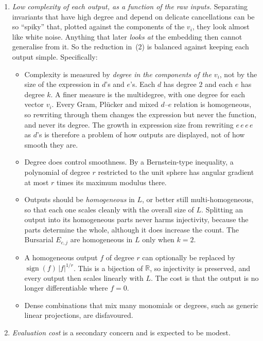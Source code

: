 \documentclass[11pt]{article}
\theoremstyle{definition}
\theoremstyle{remark}
\begin{document}
\begin{enumerate}
  \item \emph{Low complexity of each output, as a function of the raw inputs.}
    Separating invariants that have high degree and depend on delicate
    cancellations can be so ``spiky'' that, plotted against the components of
    the $v_i$, they look almost like white noise. Anything that later
    \emph{looks at} the embedding then cannot generalise from it. So the
    reduction in~(2) is balanced against keeping each output simple. Specifically:
    \begin{itemize}
      \item Complexity is measured by \emph{degree in the components of the
        $v_i$}, not by the size of the expression in $d$'s and $e$'s. Each $d$
        has degree $2$ and each $e$ has degree $k$. A finer measure is the
        multidegree, with one degree for each vector $v_i$. Every Gram,
        Plücker and mixed $d$--$e$ relation is homogeneous, so rewriting
        through them changes the expression but never the function, and never
        its degree. The growth in expression size from rewriting $e\,e\,e\,e$
        as $d$'s is therefore a problem of how outputs are displayed, not of
        how smooth they are.
      \item Degree does control smoothness. By a Bernstein-type inequality, a
        polynomial of degree $r$ restricted to the unit sphere has angular
        gradient at most $r$ times its maximum modulus there.
      \item Outputs should be \emph{homogeneous} in $L$, or better still
        multi-homogeneous, so that each one scales cleanly with the overall
        size of $L$. Splitting an output into its homogeneous parts never
        harms injectivity, because the parts determine the whole, although it
        does increase the count. The Bursarial $E_{c,j}$ are homogeneous in
        $L$ only when $k = 2$.
      \item A homogeneous output $f$ of degree $r$ can optionally be replaced by
        $\operatorname{sign}(f)\,|f|^{1/r}$. This is a bijection of
        $\mathbb{R}$, so injectivity is preserved, and every output then
        scales linearly with $L$. The cost is that the output is no longer
        differentiable where $f = 0$.
      \item Dense combinations that mix many monomials or degrees, such as
        generic linear projections, are disfavoured.
    \end{itemize}

  \item \emph{Evaluation cost} is a secondary concern and is expected to be
    modest.
\end{enumerate}
\end{document}
